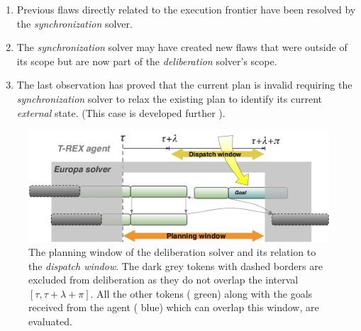 \begin{enumerate}

\item Previous flaws directly related to the execution frontier have
  been resolved by the {\em synchronization} solver.

\item The {\em synchronization} solver may have created new flaws that
  were outside of its scope but are now part of the {\em deliberation}
  solver's scope.

\item The last observation has proved that the current plan is invalid
  requiring the {\em synchronization} solver to relax the existing
  plan to identify its current {\em external} state. (This case is
  developed further ).

\end{enumerate}

\begin{figure}[b]
  \centering
  \includegraphics[width=0.65\columnwidth]{figs/plan_window.jpeg}
  \caption{\small The planning window of the deliberation solver and
    its relation to the {\em dispatch window}. The dark grey tokens
    with dashed borders are excluded from deliberation as they do not
    overlap the interval $[\tau, \tau+\lambda+\pi]$. All the other
    tokens ({\color{green} green}) along with the goals received from
    the agent ({\color{blue} blue}) which can overlap this window, are
    evaluated.}
  \label{fig:plan:window}
\end{figure}


